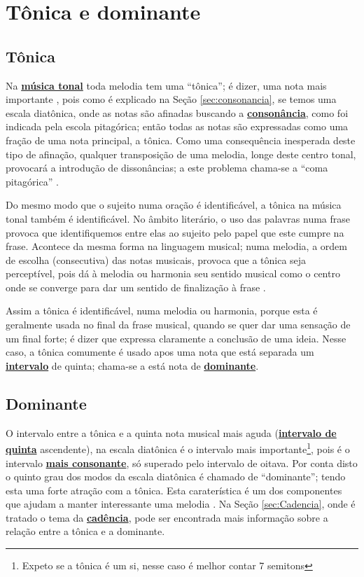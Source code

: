 \section{Tônica e dominante}


\subsection{Tônica}
\label{sec:Tonica}
Na \hyperref[sec:MusicaTonal]{\textbf{música tonal}} toda melodia tem uma ``tônica''; 
é dizer, uma nota mais importante \cite[pp. 19]{holst1998abc}, 
pois como é explicado na Seção \ref{sec:consonancia}, se temos uma escala diatônica,
onde as notas são afinadas buscando a \hyperref[ref:consonancia]{\textbf{consonância}},
como foi indicada pela escola pitagórica; então todas as notas são expressadas
como uma fração de uma nota principal, a tônica. 
Como uma consequência inesperada deste tipo de afinação, 
qualquer transposição de uma melodia, longe deste centro tonal, 
provocará a introdução de dissonâncias;
a este problema chama-se a ``coma pitagórica'' \cite[pp. 24]{arbones2012armonia}.
 

Do mesmo modo que o sujeito numa oração é identificável, a tônica na música tonal também é identificável.
No âmbito literário, o uso das palavras numa frase 
provoca que identifiquemos entre elas ao sujeito pelo papel que este cumpre na frase.
Acontece da mesma forma na linguagem musical; numa melodia,
a ordem de escolha (consecutiva) das notas musicais, 
provoca que a tônica seja perceptível, pois dá à melodia ou harmonia 
seu sentido musical como o centro onde se converge para dar um sentido de finalização à frase \cite[pp. 19]{holst1998abc}.

Assim a tônica é identificável, numa melodia ou harmonia, 
porque esta é geralmente  usada no final  da frase musical, 
quando se quer dar uma sensação de um final forte;
é dizer que expressa claramente a conclusão de uma ideia.
Nesse caso, a tônica comumente é usado apos uma nota que está separada um 
\hyperref[sec:intervalomelodico]{\textbf{intervalo}} de quinta;
chama-se a está nota de \hyperref[sec:dominante]{\textbf{dominante}}.

\subsection{Dominante}
\label{sec:dominante}

O intervalo entre a tônica e a quinta nota musical mais aguda 
(\hyperref[fig:abc-iquinta2]{\textbf{intervalo de quinta}} ascendente), 
na escala diatônica 
é o intervalo mais importante\footnote{Expeto se a tônica é um si, nesse caso é melhor contar 7 semitons},
pois é o intervalo \hyperref[tab:pitagorascromatica2]{\textbf{mais consonante}}, 
só superado pelo intervalo de oitava. 
Por conta disto o quinto grau dos modos da escala diatônica é chamado  de ``dominante'';
tendo esta uma forte atração com a tônica. 
Esta caraterística é um dos componentes que ajudam a manter interessante  uma melodia \cite[pp. 24]{holst1998abc}.
Na Seção \ref{sec:Cadencia}, onde é tratado o tema da \hyperref[sec:Cadencia]{\textbf{cadência}},
pode ser encontrada mais informação sobre a relação entre a tônica e a dominante.

